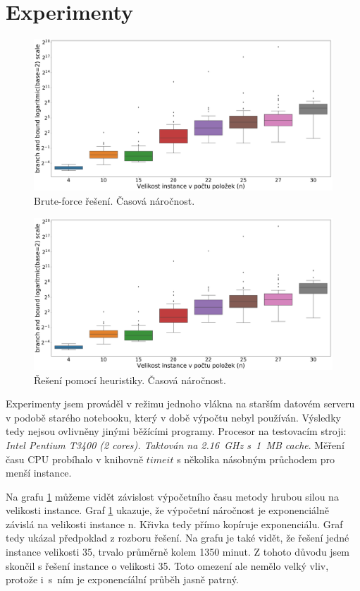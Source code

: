 \documentclass[11pt]{article}
\begin{document}
\section{Experimenty}
\begin{figure}\centering
	\includegraphics[scale=0.25]{img/boxBB}
 	\caption[1]{Brute-force řešení. Časová náročnost.}\label{fig:1}
 \end{figure} 	
 \begin{figure}\centering
	\includegraphics[scale=0.25]{img/boxBB}
 	\caption[2]{Řešení pomocí heuristiky. Časová náročnost.}\label{fig:2}
 \end{figure} 	
 
Experimenty jsem prováděl v režimu jednoho vlákna na starším datovém serveru v podobě starého notebooku, který v době výpočtu nebyl používán. Výsledky tedy nejsou ovlivněny jinými běžícími programy. Procesor na testovacím stroji: \textit{Intel Pentium T3400 (2 cores). Taktován na 2.16~GHz s~1~MB cache}.
Měření času CPU probíhalo v knihovně $timeit$ s několika násobným průchodem pro menší instance.

Na grafu \ref{fig:1} můžeme vidět závislost výpočetního času metody hrubou silou na velikosti instance. Graf \ref{fig:1} ukazuje, že výpočetní náročnost je exponenciálně závislá na velikosti instance n. Křivka tedy přímo kopíruje exponenciálu. Graf tedy ukázal předpoklad z rozboru řešení. Na grafu je také vidět, že řešení jedné instance velikosti 35, trvalo průměrně kolem 1350 minut. Z tohoto důvodu jsem skončil s řešení instance o velikosti 35. Toto omezení ale nemělo velký vliv, protože i~s~ním je exponencíální průběh jasně patrný.
\end{document}
